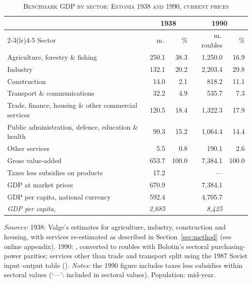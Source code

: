 \begin{table}[htbp]
\centering\small
\caption[Benchmark GDP by sector: Estonia 1938 and 1990, current prices]{\textsc{Benchmark GDP by sector: Estonia 1938 and 1990, current prices}}
\label{tab:benchmarks}
\begin{threeparttable}
\begin{tabular}{lrrrr}
\toprule
& \multicolumn{2}{c}{1938} & \multicolumn{2}{c}{1990} \\
\cmidrule(lr){2-3}\cmidrule(lr){4-5}
Sector & m.\,\eek{} & \% & m.\,roubles & \% \\
\midrule
Agriculture, forestry \& fishing & 250.1 & 38.3 & 1,250.0 & 16.9 \\
Industry & 132.1 & 20.2 & 2,203.4 & 29.8 \\
Construction & 14.0 & 2.1 & 818.2 & 11.1 \\
Transport \& communications & 32.2 & 4.9 & 535.7 & 7.3 \\
Trade, finance, housing \& other commercial services & 120.5 & 18.4 & 1,322.3 & 17.9 \\
Public administration, defence, education \& health & 99.3 & 15.2 & 1,064.4 & 14.4 \\
Other services & 5.5 & 0.8 & 190.1 & 2.6 \\
\midrule
Gross value-added & 653.7 & 100.0 & 7,384.1 & 100.0 \\
Taxes less subsidies on products & 17.2 & & --- & \\
GDP at market prices & 670.9 & & 7,384.1 & \\
GDP per capita, national currency & 592.4 & & 4,705.7 & \\
\textit{GDP per capita, \intlnineteen{}} & \textit{2,685} & & \textit{8,425} & \\
\bottomrule
\end{tabular}
\begin{tablenotes}
\footnotesize
\textit{Sources:} 1938: Valge's estimates for agriculture, industry, construction and housing, with services re-estimated as described in Section~\ref{sec:method} (see online appendix). 1990: \cite[184--6]{bolotin1992}, converted to roubles with Bolotin's sectoral purchasing-power parities; services other than trade and transport split using the 1987 Soviet input--output table (\cite{wbinputoutput1987}). \textit{Notes:} the 1990 figure includes taxes less subsidies within sectoral values (`---': included in sectoral values). Population: mid-year.
\end{tablenotes}
\end{threeparttable}
\end{table}
